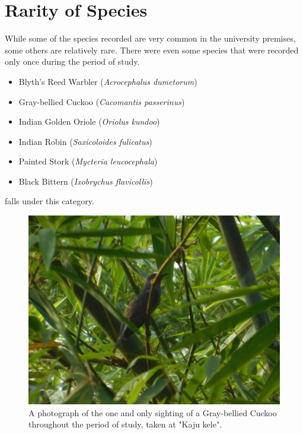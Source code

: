 \section{Rarity of Species}
While some of the species recorded are very common in the university premises, some others are relatively rare. There were even some species that were recorded only once during the period of study.
\begin{itemize}
    \item Blyth's Reed Warbler (\textit{Acrocephalus dumetorum})
    \item Gray-bellied Cuckoo (\textit{Cacomantis passerinus})
    \item Indian Golden Oriole (\textit{Oriolus kundoo})
    \item Indian Robin (\textit{Saxicoloides fulicatus})
    \item Painted Stork (\textit{Mycteria leucocephala})
    \item Black Bittern (\textit{Ixobrychus flavicollis})
\end{itemize}
falls under this category.
\begin{figure}[!htpb]
    \centering
    \includegraphics[width=\linewidth]{Figures/gray-bellied-cuckoo.JPG}
    \caption[]{A photograph of the one and only sighting of a Gray-bellied Cuckoo throughout the period of study, taken at "Kaju kele".}
    \label{fig:figure-01}
\end{figure}

